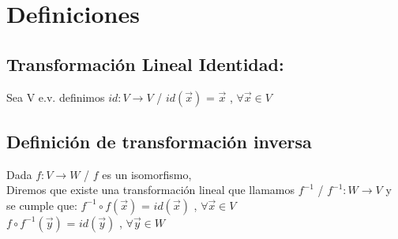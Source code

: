 \documentclass[11pt]{article}
\begin{document}
\section{Definiciones}
\subsection{Transformación Lineal Identidad:}
Sea V e.v. definimos $id: V \rightarrow V$ / $id(\vec{x})$ = $\vec{x}$ , $\forall \vec{x} \in V$
\subsection{Definición de transformación inversa}
Dada $f : V \rightarrow W$ / $f$ es un isomorfismo,\\
Diremos que existe una transformación lineal que llamamos $f^{-1}$ / $f^{-1} : W \rightarrow V$ y se cumple que:
$f^{-1} \circ f (\vec{x})$ = $id(\vec{x})$ , $\forall \vec{x} \in V$ \\
$f \circ f^{-1} (\vec{y})$ = $id(\vec{y})$ , $\forall \vec{y} \in W$ \\
\end{document}
